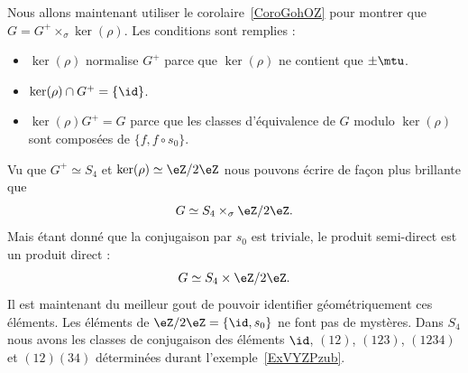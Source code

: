 Nous allons maintenant utiliser le corolaire~\ref{CoroGohOZ} pour montrer que \( G=G^+\times_{\sigma}\ker(\rho)\). Les conditions sont remplies :
\begin{itemize}
    \item \( \ker(\rho)\) normalise \( G^+\) parce que \( \ker(\rho)\) ne contient que \( \pm\mtu\).
    \item \( \ker(\rho)\cap G^+=\{ \id \}\).
    \item \( \ker(\rho)G^+=G\) parce que les classes d'équivalence de \( G\) modulo \( \ker(\rho)\) sont composées de \( \{ f,f\circ s_0 \}\).
\end{itemize}
Vu que \( G^+\simeq S_4\) et \( \ker(\rho)\simeq \eZ/2\eZ\) nous pouvons écrire de façon plus brillante que
\begin{equation}
    G\simeq S_4\times_{\sigma}\eZ/2\eZ.
\end{equation}
Mais étant donné que la conjugaison par \( s_0\) est triviale, le produit semi-direct est un produit direct :
\begin{equation}
    G\simeq S_4\times\eZ/2\eZ.
\end{equation}
Il est maintenant du meilleur gout de pouvoir identifier géométriquement ces éléments. Les éléments de \( \eZ/2\eZ=\{ \id,s_0 \}\) ne font pas de mystères. Dans \( S_4\) nous avons les classes de conjugaison des éléments \( \id\), \( (12)\), \( (123)\), \( (1234)\) et \( (12)(34)\) déterminées durant l'exemple~\ref{ExVYZPzub}.
